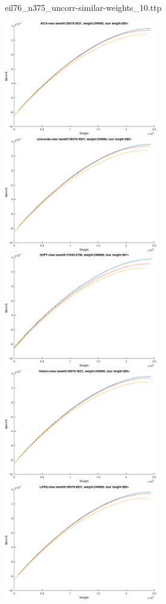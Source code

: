 \documentclass{article}
\begin{document}
\newpage
eil76\_n375\_uncorr-similar-weights\_10.ttp

\noindent
\includegraphics[width=0.5\textwidth]{eil76figs/eil76_n375_uncorr-similar-weights_10.ttp.aco.txt.atsf.eps}
\includegraphics[width=0.5\textwidth]{eil76figs/eil76_n375_uncorr-similar-weights_10.ttp.con.txt.atsf.eps}
\includegraphics[width=0.5\textwidth]{eil76figs/eil76_n375_uncorr-similar-weights_10.ttp.inv.txt.atsf.eps}
\includegraphics[width=0.5\textwidth]{eil76figs/eil76_n375_uncorr-similar-weights_10.ttp.lkh.txt.atsf.eps}
\includegraphics[width=0.5\textwidth]{eil76figs/eil76_n375_uncorr-similar-weights_10.ttp.lkh2.txt.atsf.eps}
\end{document}
